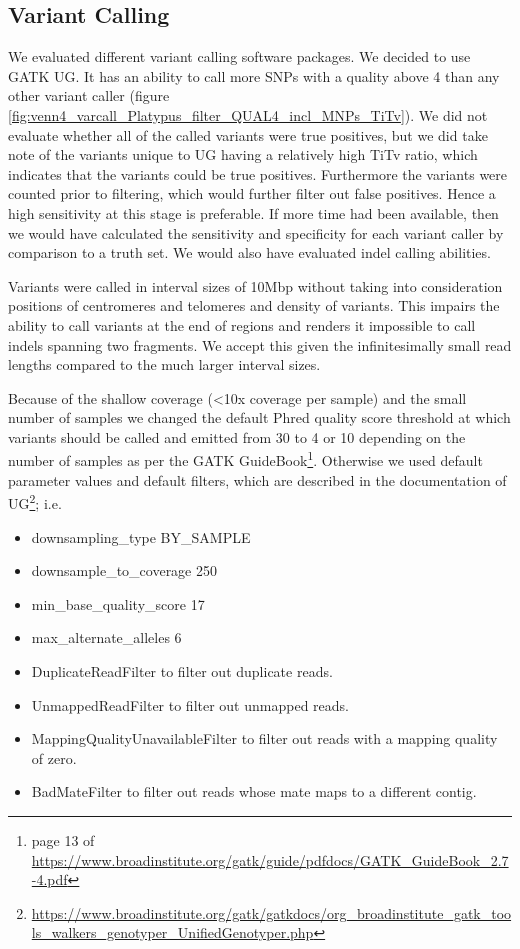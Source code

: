 \subsection{Variant Calling}
We evaluated different variant calling software packages. We decided to use \gls{GATK} \gls{UG}. It has an ability to call more \glspl{SNP} with a quality above 4 than any other variant caller (figure \ref{fig:venn4_varcall_Platypus_filter_QUAL4_incl_MNPs_TiTv}). We did not evaluate whether all of the called variants were true positives, but we did take note of the variants unique to \gls{UG} having a relatively high \gls{TiTv} ratio, which indicates that the variants could be true positives. Furthermore the variants were counted prior to filtering, which would further filter out false positives. Hence a high sensitivity at this stage is preferable. If more time had been available, then we would have calculated the sensitivity and specificity for each variant caller by comparison to a truth set. We would also have evaluated indel calling abilities.



Variants were called in interval sizes of 10\gls{Mbp} without taking into consideration positions of centromeres and telomeres and density of variants. This impairs the ability to call variants at the end of regions and renders it impossible to call indels spanning two fragments. We accept this given the infinitesimally small read lengths compared to the much larger interval sizes.

Because of the shallow coverage (\textless 10x coverage per sample) and the small
number of samples we changed the default Phred quality score threshold at which variants should be called and emitted from 30 to 4 or 10 depending on the number of samples as per the \gls{GATK} GuideBook\footnote{page 13 of \url{https://www.broadinstitute.org/gatk/guide/pdfdocs/GATK_GuideBook_2.7-4.pdf}}. Otherwise we used default parameter values and default filters, which are described in the documentation of \gls{UG}\footnote{\url{https://www.broadinstitute.org/gatk/gatkdocs/org_broadinstitute_gatk_tools_walkers_genotyper_UnifiedGenotyper.php}}; i.e.
\begin{itemize}
\item \-\-downsampling\_type BY\_SAMPLE
\item \-\-downsample\_to\_coverage 250
\item \-\-min\_base\_quality\_score 17
\item \-\-max\_alternate\_alleles 6
\item DuplicateReadFilter to filter out duplicate reads.
\item UnmappedReadFilter to filter out unmapped reads.
\item MappingQualityUnavailableFilter to filter out reads with a mapping quality of zero.
\item BadMateFilter to filter out reads whose mate maps to a different contig.
\end{itemize}

